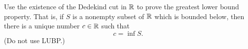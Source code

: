 \begin{exercise}
  \label{ex:hw03:dedekind-infimum}
  Use the existence of the Dedekind cut in $\mathbb{R}$ to prove the greatest lower
  bound property. That is, if $S$ is a nonempty subset of $\mathbb{R}$ which is
  bounded below, then there is a unique number $c\in\mathbb{R}$ such that
  \[
    c=\inf S.
  \]
  (Do not use LUBP.)
\end{exercise}
